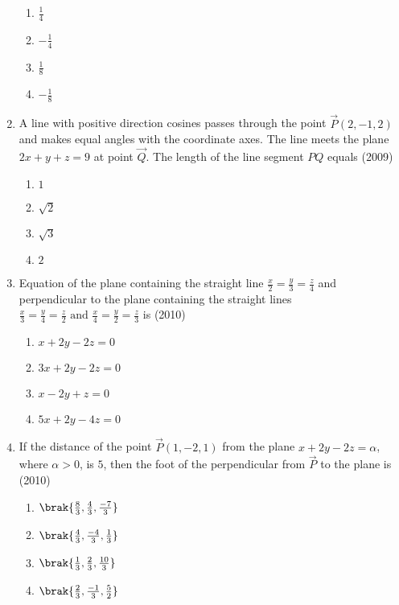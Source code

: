 \begin{enumerate}
\begin{multicols}{2}
    	\begin{enumerate}
    		\item $\frac{1}{4}$
    		\item $-\frac{1}{4}$
    		\item $\frac{1}{8}$
    		\item $-\frac{1}{8}$
    	\end{enumerate}
    \end{multicols}
    \item A line with positive direction cosines passes through the point $\vec{P}(2,-1,2)$ and makes equal angles with the coordinate axes. The line meets the plane $2x+y+z=9$ at point $\vec{Q}$. The length of the line segment $PQ$ equals 
    \hfill{(2009)}
    \begin{multicols}{2}
    	\begin{enumerate}
    		\item $1$
    		\item $\sqrt{2}$
    		\item $\sqrt{3}$
    		\item $2$
    	\end{enumerate}
    \end{multicols}
    \item Equation of the plane containing the straight line $\frac{x}{2}=\frac{y}{3}=\frac{z}{4}$ and perpendicular to the plane containing the straight lines $\frac{x}{3}=\frac{y}{4}=\frac{z}{2} \text{ and } \frac{x}{4}=\frac{y}{2}=\frac{z}{3}$ is 
    \hfill{(2010)}
    \begin{enumerate}
    	\item $x+2y-2z=0$
    	\item $3x+2y-2z=0$
    	\item $x-2y+z=0$
    	\item $5x+2y-4z=0$
    \end{enumerate}
    \item If the distance of the point $\vec{P}(1,-2,1)$ from the plane $x+2y-2z=\alpha$, where $\alpha>0$, is $5$, then the foot of the perpendicular from $\vec{P}$ to the plane is
    \hfill{(2010)}
    \begin{enumerate}
    	\item $\brak{\frac{8}{3}, \frac{4}{3}, \frac{-7}{3}}$
    	\item $\brak{\frac{4}{3}, \frac{-4}{3}, \frac{1}{3}}$
    	\item $\brak{\frac{1}{3}, \frac{2}{3}, \frac{10}{3}}$
    	\item $\brak{\frac{2}{3}, \frac{-1}{3}, \frac{5}{2}}$

\end{enumerate}
\end{enumerate}
